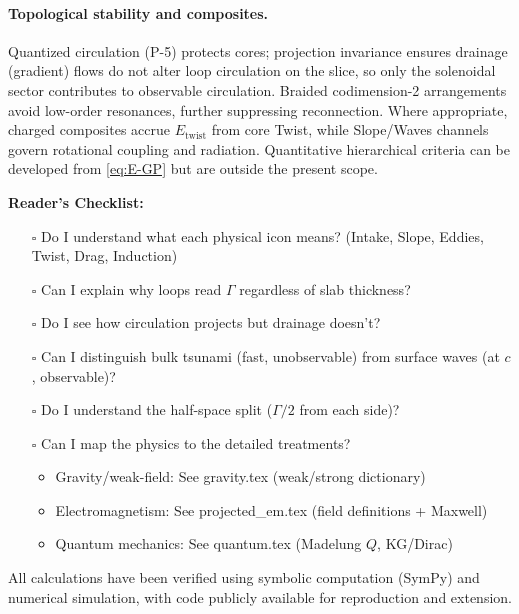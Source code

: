 \paragraph{Topological stability and composites.}
Quantized circulation (P-5) protects cores; projection invariance ensures drainage (gradient) flows do not alter loop circulation on the slice, so only the solenoidal sector contributes to observable circulation. Braided codimension-2 arrangements avoid low-order resonances, further suppressing reconnection. Where appropriate, charged composites accrue $E_{\text{twist}}$ from core Twist, while Slope/Waves channels govern rotational coupling and radiation. Quantitative hierarchical criteria can be developed from \eqref{eq:E-GP} but are outside the present scope.

\medskip
\noindent
{}
\medskip

\textbf{Reader's Checklist:}
\begin{itemize}
\item[$\square$] Do I understand what each physical icon means? (Intake, Slope, Eddies, Twist, Drag, Induction)
\item[$\square$] Can I explain why loops read $\Gamma$ regardless of slab thickness?
\item[$\square$] Do I see how circulation projects but drainage doesn't?
\item[$\square$] Can I distinguish bulk tsunami (fast, unobservable) from surface waves (at $c$, observable)?
\item[$\square$] Do I understand the half-space split ($\Gamma/2$ from each side)?
\item[$\square$] Can I map the physics to the detailed treatments?
  \begin{itemize}
    \item Gravity/weak-field: See gravity.tex (weak/strong dictionary)
    \item Electromagnetism: See projected\_em.tex (field definitions + Maxwell)
    \item Quantum mechanics: See quantum.tex (Madelung $Q$, KG/Dirac)
  \end{itemize}
\end{itemize}

All calculations have been verified using symbolic computation (SymPy) and numerical simulation, with code publicly available for reproduction and extension.
